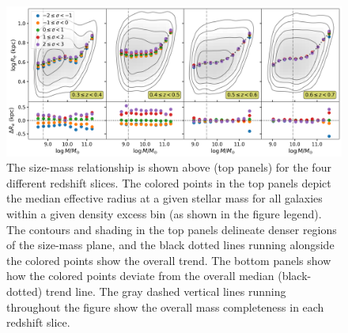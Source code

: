 \begin{figure}[htb]
    \centering
    \includegraphics[width = \textwidth]{r_m_all.png}
    \caption{The size-mass relationship is shown above (top panels) for the four different redshift slices. The colored points in the top panels depict the median effective radius at a given stellar mass for all galaxies within a given density excess bin (as shown in the figure legend). The contours and shading in the top panels delineate denser regions of the size-mass plane, and the black dotted lines running alongside the colored points show the overall trend. The bottom panels show how the colored points deviate from the overall median (black-dotted) trend line. The gray dashed vertical lines running throughout the figure show the overall mass completeness in each redshift slice.}
    \label{fig_c4:r_m_all}
\end{figure}

